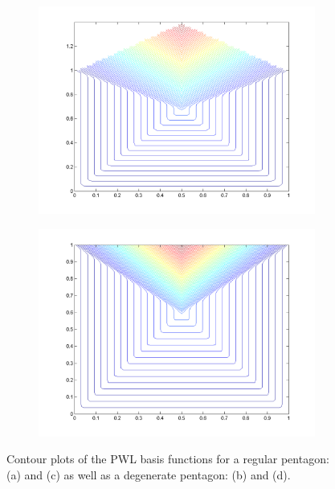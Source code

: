 \begin{figure}
\begin{subfigure}[b]{0.48\textwidth}
		\includegraphics[width=\textwidth]{figures/sec_BF/PWL_rpent_contour_E.png}
		\caption{}
	\end{subfigure}
	\hfill
	\begin{subfigure}[b]{0.48\textwidth}
		\centering
		\includegraphics[width=\textwidth]{figures/sec_BF/PWL_dpent_contour_E.png}
		\caption{}
	\end{subfigure}
\caption{Contour plots of the PWL basis functions for a regular pentagon: (a) and (c) as well as a degenerate pentagon: (b) and (d).}
\end{figure}

